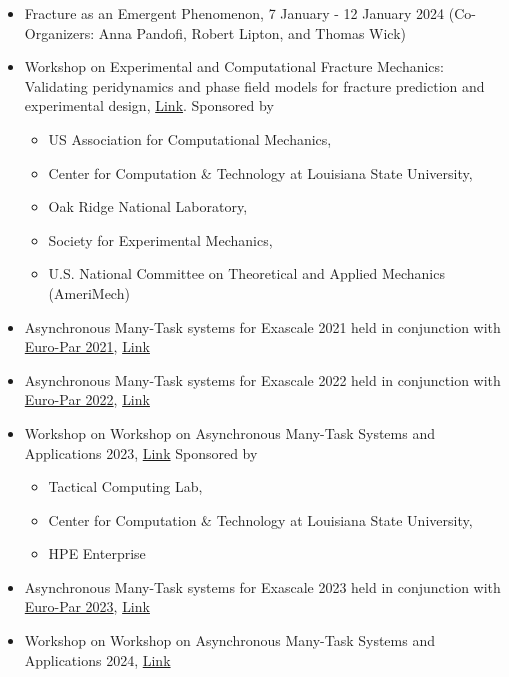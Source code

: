 \documentclass[11pt,a4paper,sans]{moderncv}
\begin{document}
\begin{itemize}[leftmargin=4cm]
\item Fracture as an Emergent Phenomenon, 7 January - 12 January 2024 (Co-Organizers: Anna Pandofi, Robert Lipton, and Thomas Wick)

\end{itemize}

\begin{itemize}[leftmargin=4cm]
\item Workshop on Experimental and Computational Fracture Mechanics:  Validating peridynamics and phase field models for fracture
prediction and experimental design, \href{http://wfm2020.usacm.org/}{Link}. Sponsored by
\begin{itemize}
\item US Association for Computational Mechanics,
\item Center for Computation \& Technology at Louisiana State University, 
\item Oak Ridge National Laboratory,
\item Society for Experimental Mechanics,
\item U.S. National Committee on Theoretical and Applied Mechanics (AmeriMech)
\end{itemize}
\item Asynchronous Many-Task systems for Exascale 2021 held in conjunction with \href{https://2021.euro-par.org/}{Euro-Par 2021},  \href{https://amte-workshop.github.io/2021}{Link}
\item Asynchronous Many-Task systems for Exascale 2022 held in conjunction with \href{https://2022.euro-par.org/}{Euro-Par 2022},  \href{https://amte-workshop.github.io/2022}{Link}
\item Workshop on Workshop on Asynchronous Many-Task Systems and Applications 2023,  \href{https://wamta23.stellar-group.org/}{Link} Sponsored by
\begin{itemize}
\item Tactical Computing Lab,
\item Center for Computation \& Technology at Louisiana State University,
\item HPE Enterprise 
\end{itemize}
\item Asynchronous Many-Task systems for Exascale 2023 held in conjunction with \href{https://2023.euro-par.org/}{Euro-Par 2023},  \href{https://amte-workshop.github.io/2023}{Link}
\item Workshop on Workshop on Asynchronous Many-Task Systems and Applications 2024,  \href{http://wamta24.icl.utk.edu/}{Link}

\end{itemize}
\end{document}
